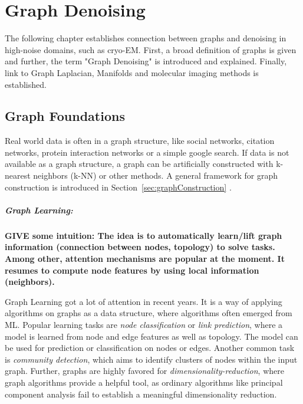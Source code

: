 \chapter{Graph Denoising}
\label{sec:graphFoundations}
    

The following chapter establishes connection between graphs and denoising in high-noise 
domains, such as cryo-EM.
First, a broad definition of graphs is given and further, the term "Graph Denoising" is
introduced and explained. Finally, link to Graph Laplacian, Manifolds and molecular imaging methods is established.

\section{Graph Foundations}
Real world data is often in a graph structure, like social networks, citation networks,
protein interaction networks or a simple google search. 
If data is not available as a graph structure, a graph can be artificially constructed with k-nearest neighbors (k-NN) or other methods.
A general framework for graph construction is introduced in Section~\ref{sec:graphConstruction} \textit{}.

\paragraph{Graph Learning:} 

\textbf{GIVE some intuition:
The idea is to automatically learn/lift graph information
 (connection between nodes, topology) to solve tasks. 
 Among other, attention mechanisms are popular at the moment. 
 It resumes to compute node features by using local information (neighbors).}

Graph Learning got a lot of attention in recent years.
It is a way of applying algorithms on graphs as a data structure, where algorithms often emerged from ML.
Popular learning tasks are \textit{node classification} or \textit{link prediction}, where a model is learned from node and edge features 
as well as topology. The model can be used for prediction or classification on nodes or edges.
Another common task is \textit{community detection}, which aims to identify clusters of nodes within the input graph.
Further, graphs are highly favored for \textit{dimensionality-reduction}, where 
graph algorithms provide a helpful tool, as ordinary algorithms like principal component analysis fail to 
establish a meaningful dimensionality reduction.

